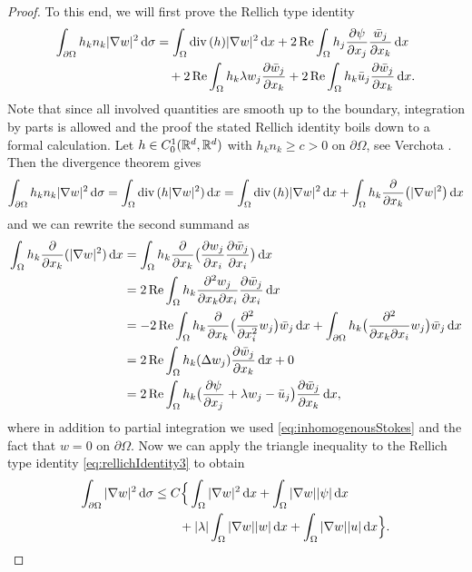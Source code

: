 \begin{proof}
  To this end, we will first prove the Rellich type identity
  \begin{align}
    \int_{\partial\Omega} h_k n_k |\nabla w|^2 \, {\operatorname{d}\!{\sigma}}
    &= \int_\Omega \mathrm{div\,} (h) |\nabla w|^2 \, {\operatorname{d}\!{x}} + 2 \operatorname{Re} \int_{\Omega} h_j \frac{\partial \psi}{\partial x_j} \frac{\bar w_j}{\partial x_k}\, {\operatorname{d}\!{x}}  \nonumber \\
    &\quad + 2 \operatorname{Re} \int_\Omega h_k \lambda w_j \frac{\partial\bar w_j}{\partial x_k} + 2 \operatorname{Re} \int_\Omega h_k \bar u_j \frac{\partial \bar w_j}{\partial x_k} \, {\operatorname{d}\!{x}}. \label{eq:rellichIdentity3}
  \end{align} 
  Note that since all involved quantities are smooth up to the boundary, integration by parts is allowed and the proof the stated  Rellich identity boils down to a formal calculation.
  Let $h \in C_0^1(\mathbb{R}^d, \mathbb{R}^d)$ with $h_k n_k \geq c > 0$ on $\partial \Omega$, see Verchota \cite{verchotaDiss}.
  Then the divergence theorem gives
  \begin{align*}
    \int_{\partial\Omega} h_k n_k |\nabla w|^2 \, {\operatorname{d}\!{\sigma}}
    = \int_{\Omega} \mathrm{div\,} (h |\nabla w|^2) \, {\operatorname{d}\!{x}} = \int_\Omega \mathrm{div\,} (h) |\nabla w|^2 \, {\operatorname{d}\!{x}} + \int_\Omega h_k \frac{\partial}{\partial x_k} \big( |\nabla w|^2 \big) \, {\operatorname{d}\!{x}}
  \end{align*}
  and we can rewrite the second summand as
  \begin{align*}
    \int_{\Omega} h_k \frac{\partial}{\partial x_k} (|\nabla w|^2) \, {\operatorname{d}\!{x}}
    &= \int_{\Omega} h_k \frac{\partial}{\partial x_k} \big( \frac{\partial w_j}{\partial x_i} \frac{\partial \bar w_j}{\partial x_i}\big) \, {\operatorname{d}\!{x}} \\
    &= 2 \operatorname{Re} \int_\Omega h_k \frac{\partial^2 w_j}{\partial x_k \partial x_i} \frac{\partial \bar w_j}{\partial x_i} \, {\operatorname{d}\!{x}} \\
    &= - 2 \operatorname{Re} \int_\Omega h_k \frac{\partial}{\partial x_k} \big( \frac{\partial^2}{\partial x_i^2} w_j \big) \bar w_j \, {\operatorname{d}\!{x}} + \int_{\partial\Omega} h_k \big( \frac{\partial^2}{\partial x_k \partial x_i} w_j \big) \bar w_j \, {\operatorname{d}\!{x}}\\
    &= 2 \operatorname{Re} \int_\Omega h_k ( \Delta w_j ) \frac{\partial \bar w_j}{\partial x_k} \, {\operatorname{d}\!{x}} + 0 \\
    &= 2 \operatorname{Re} \int_\Omega h_k \big( \frac{\partial \psi}{\partial x_j} + \lambda w_j - \bar u_j \big) \frac{\partial \bar w_j}{\partial x_k} \, {\operatorname{d}\!{x}},
  \end{align*}
  where in addition to partial integration we used \eqref{eq:inhomogenousStokes} and the fact that $w = 0$ on $\partial\Omega$.
  Now we can apply the triangle inequality to the Rellich type identity \eqref{eq:rellichIdentity3} to obtain
  \begin{align}
    \int_{\partial\Omega} |\nabla w|^2 \, {\operatorname{d}\!{\sigma}} 
    &\leq C \Big\{ \int_\Omega |\nabla w|^2 \, {\operatorname{d}\!{x}} + \int_\Omega |\nabla w | |\psi| \, {\operatorname{d}\!{x}} \nonumber\\
    &\qquad + |\lambda| \int_\Omega |\nabla w| |w| \, {\operatorname{d}\!{x}} + \int_\Omega |\nabla w| |u| \, {\operatorname{d}\!{x}} \Big\}. \label{eq:rellichInequality3}
  \end{align}


\end{proof}

